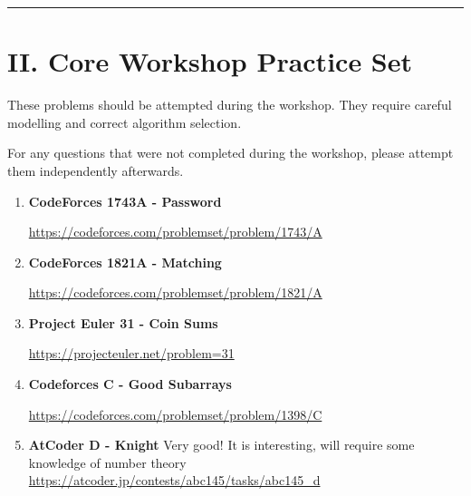 \documentclass[11pt]{article}
\begin{document}
\vspace{1em}
\hrule
\vspace{1em}

\section*{II. Core Workshop Practice Set}

These problems should be attempted during the workshop.  
They require careful modelling and correct algorithm selection.

For any questions that were not completed during the workshop, please attempt them independently afterwards.

\begin{enumerate}
    \item \textbf{CodeForces 1743A - Password}
    
    \vspace{0.3em}
    {\url{https://codeforces.com/problemset/problem/1743/A}}
                \vspace{0.8em}

    \item \textbf{CodeForces 1821A - Matching}
    
    \vspace{0.3em}
    {\url{https://codeforces.com/problemset/problem/1821/A}}
                \vspace{0.8em} 
          

    \item \textbf{Project Euler 31 - Coin Sums}  
    
    \vspace{0.3em}
    {\url{https://projecteuler.net/problem=31}}


    \vspace{0.8em}              

    \item \textbf{Codeforces C - Good Subarrays}  
    
    \vspace{0.3em}
    {\url{https://codeforces.com/problemset/problem/1398/C}}

    \vspace{0.8em}              

    \item \textbf{AtCoder D - Knight}  
    Very good! It is interesting, will require some knowledge of number theory
    \vspace{0.3em}
    {\url{https://atcoder.jp/contests/abc145/tasks/abc145_d}}
\end{enumerate}
\end{document}
